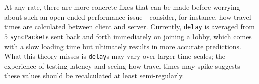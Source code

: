 \documentclass[a4paper, 9pt]{article}
\begin{document}
\begin{flushleft}
\vspace{5pt}\noindent
At any rate, there are more concrete fixes that can be made before worrying about such an open-ended performance issue - consider, for instance, how travel times are calculated between client and server. Currently, \texttt{delay} is averaged from $5$ \texttt{syncPacket}s sent back and forth immediately on joining a lobby, which comes with a slow loading time but ultimately results in more accurate predictions. What this theory misses is \texttt{delay}s may vary over larger time scales; the experience of testing latency and seeing how travel times may spike suggests these values should be recalculated at least semi-regularly. %



\end{flushleft}
\end{document}
